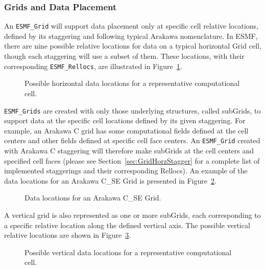\subsubsection{Grids and Data Placement}
\label{sec:GridDataPlacement}
An {\tt ESMF\_Grid} will support data placement only at specific cell relative
locations, defined by its staggering and following typical Arakawa nomenclature.
In ESMF, there are nine possible relative locations for data on a typical
horizontal Grid cell, though each staggering will use a subset of them.  These
locations, with their corresponding {\tt ESMF\_Rellocs}, are illustrated in
Figure~\ref{fig:GridDataLocations}.

\begin{center}
\begin{figure}
\caption{Possible horizontal data locations for a representative computational
cell. }
\label{fig:GridDataLocations}
\end{figure}
\end{center}

{\tt ESMF\_Grids} are created with only those underlying structures, called
subGrids, to support data at the specific cell locations defined by its given
staggering.  For example, an Arakawa C grid has some computational fields
defined at the cell centers and other fields defined at specific cell face
centers.  An {\tt ESMF\_Grid} created with Arakawa C staggering will therefore
make subGrids at the cell centers and specified cell faces (please see
Section~\ref{sec:GridHorzStagger} for a complete list of implemented staggerings
and their corresponding Rellocs).  An example of the data locations for an
Arakawa C\_SE Grid is presented in Figure~\ref{fig:ArakawaC_SE}.

\begin{center}
\begin{figure}
\caption{Data locations for an Arakawa C\_SE Grid.}
\label{fig:ArakawaC_SE}
\end{figure}
\end{center}

A vertical grid is also represented as one or more subGrids, each corresponding
to a specific relative location along the defined vertical axis.  The possible
vertical relative locations are shown in Figure~\ref{fig:VertGridDataLocations}.

\begin{center}
\begin{figure}
\caption{Possible vertical data locations for a representative computational cell. }
\label{fig:VertGridDataLocations}
\end{figure}
\end{center}

